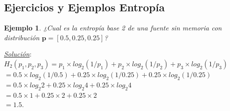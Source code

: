 \documentclass{beamer}
\newtheorem{ejemplo} [Ejemplo] {Ejemplo}
\begin{document}
\subsection{Ejercicios y Ejemplos Entropía}
\begin{frame}  \small

\begin{ejemplo}

¿Cual es la entropía base 2 de una fuente sin memoria con distribución $\textbf{p} = [0.5, 0.25, 0.25]$?
\end{ejemplo}

\pause
\textit{\underline{Solución}}:\\

$H_2(p_1, p_2, p_3)	= p_1 \times log_2(1/p_1) + p_2 \times log_2(1/p_2) + p_3 \times log_2(1/p_3) $\\
					$ = 0.5 \times log_2(1/0.5) +  0.25 \times log_2(1/0.25) + 0.25 \times log_2(1/0.25)$\\
					
                    $ = 0.5\times log_2 2 + 0.25 \times log_2 4 + 0.25 \times log_2 4 $\\
					
                    $= 0.5 \times 1 + 0.25 \times 2 + 0.25 \times 2  $\\
					
                    $= 1.5.$

\end{frame} 
\end{document}

